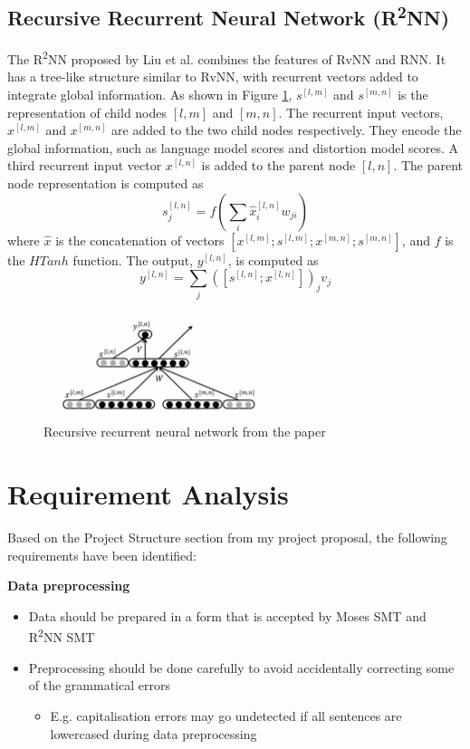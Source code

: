 \documentclass[12pt,a4paper,twoside,openright]{report}
\begin{document}
\subsection{\texorpdfstring{Recursive Recurrent Neural Network (R\textsuperscript{2}NN)}{Recursive Recurrent Neural Network (R2NN)}}\label{section:r2nn_theory}
The R\textsuperscript{2}NN proposed by Liu et al.\cite{r2nn} combines the features of RvNN and RNN. It has a tree-like structure similar to RvNN, with recurrent vectors added to integrate global information. As shown in Figure \ref{fig:r2nn}, $s^{[l, m]}$ and $s^{[m, n]}$ is the representation of child nodes $[l, m]$ and $[m, n]$. The recurrent input vectors, $x^{[l, m]}$ and $x^{[m, n]}$ are added to the two child nodes respectively. They encode the global information, such as language model scores and distortion model scores. A third recurrent input vector $x^{[l, n]}$ is added to the parent node $[l, n]$. The parent node representation is computed as
\[ s_j^{[l, n]} = f(\sum_{i} \hat{x}_i^{[l, n]}w_{ji}) \]
where $\hat{x}$ is the concatenation of vectors $[x^{[l, m]}; s^{[l, m]}; x^{[m, n]}; s^{[m, n]}]$, and $f$ is the $HTanh$ function. The output, $y^{[l, n]}$, is computed as
\[ y^{[l, n]} = \sum_{j} ([s^{[l, n]}; x^{[l, n]}])_{j}v_j \]


\begin{figure}[ht]
\centering
\includegraphics[width=0.6\textwidth]{images/r2nn.png}
\caption{Recursive recurrent neural network from the paper\cite{r2nn}}
\label{fig:r2nn}
\end{figure}

\section{Requirement Analysis}\label{section:requirement}

Based on the Project Structure section from my project proposal, the following requirements have been identified:

\textbf{Data preprocessing}
\begin{itemize}
    \item Data should be prepared in a form that is accepted by Moses SMT and R\textsuperscript{2}NN SMT
    \item Preprocessing should be done carefully to avoid accidentally correcting some of the grammatical errors 
    
    \begin{itemize}
        \item E.g. capitalisation errors may go undetected if all sentences are lowercased during data preprocessing
    \end{itemize}
\end{itemize}
\end{document}
